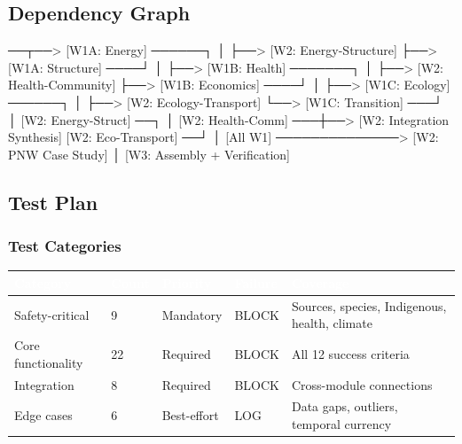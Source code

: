 \documentclass[11pt,letterpaper]{article}
\newcommand{\tableheader}[1]{\textbf{\sffamily\textcolor{white}{#1}}}
\begin{document}
\subsection{Dependency Graph}

\begin{asciibox}
  [W0: Schemas] ──┬──> [W1A: Energy] ──────┐
                  │                         ├──> [W2: Energy-Structure]
                  ├──> [W1A: Structure] ────┘
                  │
                  ├──> [W1B: Health] ───────┐
                  │                         ├──> [W2: Health-Community]
                  ├──> [W1B: Economics] ────┘
                  │
                  ├──> [W1C: Ecology] ──────┐
                  │                         ├──> [W2: Ecology-Transport]
                  └──> [W1C: Transition] ───┘
                                               │
        [W2: Energy-Struct] ──┐                │
        [W2: Health-Comm]  ───┼──> [W2: Integration Synthesis]
        [W2: Eco-Transport] ──┘         │
        [All W1] ──────────────> [W2: PNW Case Study]
                                        │
                          [W3: Assembly + Verification]
\end{asciibox}

\subsection{Test Plan}

\subsubsection{Test Categories}

\begin{center}
\begin{tabularx}{\textwidth}{L{3cm}C{1.5cm}C{2cm}C{2cm}X}
\toprule
{}
\tableheader{Category} & \tableheader{Count} & \tableheader{Priority} & \tableheader{Failure} & \tableheader{Coverage} \\
\midrule
Safety-critical & 9 & Mandatory & BLOCK & Sources, species, Indigenous, health, climate \\
Core functionality & 22 & Required & BLOCK & All 12 success criteria \\
Integration & 8 & Required & BLOCK & Cross-module connections \\
Edge cases & 6 & Best-effort & LOG & Data gaps, outliers, temporal currency \\
\bottomrule
\end{tabularx}
\end{center}
\end{document}
